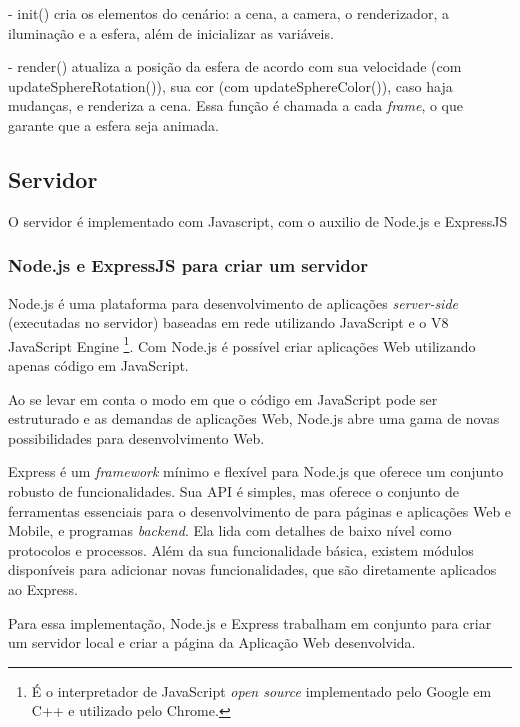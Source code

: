 \documentclass[a4paper,12pt]{article}
\begin{document}
- init() cria os elementos do cenário: a cena, a camera, o renderizador, a iluminação e a esfera, além de inicializar as variáveis.

- render() atualiza a posição da esfera de acordo com sua velocidade (com updateSphereRotation()), sua cor (com updateSphereColor()), caso haja mudanças, e renderiza a cena. Essa função é chamada a cada \emph{frame}, o que garante que a esfera seja animada.



\newpage
\subsection{Servidor}

O servidor é implementado com Javascript, com o auxilio de Node.js e ExpressJS

\subsubsection{Node.js e ExpressJS para criar um servidor}

Node.js é uma plataforma para desenvolvimento de aplicações \emph{server-side} (executadas no servidor) baseadas em rede utilizando JavaScript e o V8 JavaScript Engine \footnote{É o interpretador de JavaScript \emph{open source} implementado pelo Google em C++ e utilizado pelo Chrome.}. Com Node.js é possível criar aplicações Web utilizando apenas código em JavaScript.

Ao se levar em conta o modo em que o código em JavaScript pode ser estruturado e as demandas de aplicações Web, Node.js abre uma gama de novas possibilidades para desenvolvimento Web.


Express é um \emph{framework} mínimo e flexível para Node.js que oferece um conjunto robusto de funcionalidades. Sua API é simples, mas oferece o conjunto de ferramentas essenciais para o desenvolvimento de para páginas e aplicações Web e Mobile, e programas \emph{backend}. Ela lida com detalhes de baixo nível como protocolos e processos. Além da sua funcionalidade básica, existem módulos disponíveis para adicionar novas funcionalidades, que são diretamente aplicados ao Express.

Para essa implementação, Node.js e Express trabalham em conjunto para criar um servidor local e criar a página da Aplicação Web desenvolvida.
\end{document}
